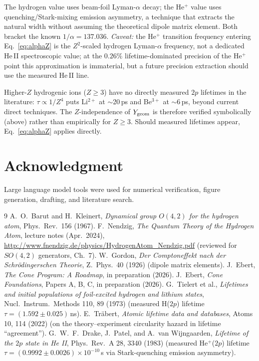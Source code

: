 \documentclass[11pt]{amsart}
\theoremstyle{remark}
\begin{document}
The hydrogen value uses beam-foil Lyman-$\alpha$ decay; the He$^+$
value uses quenching/Stark-mixing emission asymmetry, a technique
that extracts the natural width without assuming the theoretical
dipole matrix element.  Both bracket the known $1/\alpha=137.036$.
\textit{Caveat:} the He$^+$ transition frequency entering
Eq.~\eqref{eq:alphaZ} is the $Z^2$-scaled hydrogen Lyman-$\alpha$
frequency, not a dedicated He\,II spectroscopic value; at the
$0.26\%$ lifetime-dominated precision of the He$^+$ point this
approximation is immaterial, but a future precision extraction
should use the measured He\,II line.

Higher-$Z$ hydrogenic ions ($Z\geq3$) have no directly measured $2p$
lifetimes in the literature: $\tau\propto1/Z^4$ puts Li$^{2+}$ at
$\sim$20\,ps and Be$^{3+}$ at $\sim$6\,ps, beyond current direct
techniques.  The $Z$-independence of $Y_{\rm geom}$ is therefore
verified symbolically (above) rather than empirically for $Z\geq3$.
Should measured lifetimes appear, Eq.~\eqref{eq:alphaZ} applies directly.

\section*{Acknowledgment}
Large language model tools were used for numerical verification, figure generation, drafting, and literature search.

\begin{thebibliography}{9}
A.~O.~Barut and H.~Kleinert,
\textit{Dynamical group $O(4,2)$ for the hydrogen atom},
Phys.\ Rev.\ 156 (1967).
F.~Nendzig, \textit{The Quantum Theory of the Hydrogen Atom},
lecture notes (Apr.\ 2024),
\url{http://www.fnendzig.de/physics/HydrogenAtom_Nendzig.pdf}
(reviewed for $SO(4,2)$ generators, Ch.~7).
W.~Gordon, \textit{Der Comptoneffekt nach der Schr\"odingerschen Theorie},
Z.\ Phys.\ 40 (1926) (dipole matrix elements).
J.~Ebert, \textit{The Cone Program: A Roadmap}, in preparation (2026).
J.~Ebert, \textit{Cone Foundations}, Papers A, B, C, in preparation (2026).
G.~Tielert et al., \textit{Lifetimes and initial populations of
foil-excited hydrogen and lithium states},
Nucl.\ Instrum.\ Methods 110, 89 (1973)
(measured H($2p$) lifetime $\tau=(1.592\pm0.025)\,$ns).
E.~Tr\"abert, \textit{Atomic lifetime data and databases},
Atoms 10, 114 (2022) (on the theory--experiment circularity hazard
in lifetime ``agreement'').
G.~W.~F.~Drake, J.~Patel, and A.~van Wijngaarden,
\textit{Lifetime of the $2p$ state in He II},
Phys.\ Rev.\ A 28, 3340 (1983)
(measured He$^+$($2p$) lifetime
$\tau=(0.9992\pm0.0026)\times10^{-10}\,$s
via Stark-quenching emission asymmetry).
\end{thebibliography}
\end{document}

